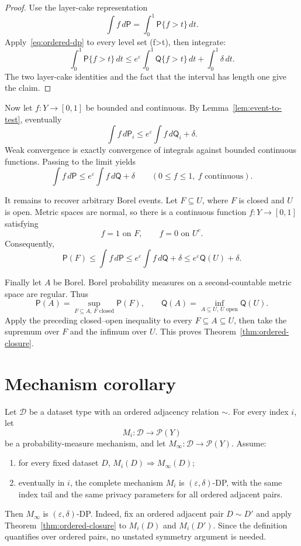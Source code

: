 \documentclass[11pt]{article}
\newcommand{\Pp}{\mathsf P}
\newcommand{\Qq}{\mathsf Q}
\begin{document}
\begin{proof}
Use the layer-cake representation
\[
  \int f\,d\Pp
  =
  \int_0^1 \Pp\{f>t\}\,dt.
\]
Apply~\eqref{eq:ordered-dp} to every level set ({f>t}), then integrate:
\[
  \int_0^1 \Pp\{f>t\}\,dt
  \leq
  e^\varepsilon\int_0^1 \Qq\{f>t\}\,dt
  +\int_0^1\delta\,dt.
\]
The two layer-cake identities and the fact that the interval has length one
give the claim.
\end{proof}

Now let \(f:Y\to[0,1]\) be bounded and continuous.  By
Lemma~\ref{lem:event-to-test}, eventually
\[
  \int f\,d\Pp_i
  \leq
  e^\varepsilon\int f\,d\Qq_i+\delta.
\]
Weak convergence is exactly convergence of integrals against bounded
continuous functions.  Passing to the limit yields
\begin{equation}
  \int f\,d\Pp
  \leq
  e^\varepsilon\int f\,d\Qq+\delta
  \qquad (0\leq f\leq1,\ f\text{ continuous}).
  \label{eq:continuous-test}
\end{equation}

It remains to recover arbitrary Borel events.  Let \(F\subseteq U\), where
\(F\) is closed and \(U\) is open.  Metric spaces are normal, so there is a
continuous function \(f:Y\to[0,1]\) satisfying
\[
  f=1\text{ on }F,
  \qquad
  f=0\text{ on }U^c.
\]
Consequently,
\[
  \Pp(F)
  \leq \int f\,d\Pp
  \leq e^\varepsilon\int f\,d\Qq+\delta
  \leq e^\varepsilon\Qq(U)+\delta.
\]

Finally let \(A\) be Borel.  Borel probability measures on a
second-countable metric space are regular.  Thus
\[
  \Pp(A)=\sup_{F\subseteq A,\,F\text{ closed}}\Pp(F),
  \qquad
  \Qq(A)=\inf_{A\subseteq U,\,U\text{ open}}\Qq(U).
\]
Apply the preceding closed--open inequality to every
\(F\subseteq A\subseteq U\), then take the supremum over \(F\) and the
infimum over \(U\).  This proves Theorem~\ref{thm:ordered-closure}.

\section{Mechanism corollary}

Let \(\mathcal D\) be a dataset type with an ordered adjacency relation
\(\sim\).  For every index \(i\), let
\[
  M_i:\mathcal D\to\mathcal P(Y)
\]
be a probability-measure mechanism, and let
\(M_\infty:\mathcal D\to\mathcal P(Y)\).  Assume:
\begin{enumerate}
  \item for every fixed dataset \(D\), \(M_i(D)\Rightarrow M_\infty(D)\);
  \item eventually in \(i\), the complete mechanism \(M_i\) is
  \((\varepsilon,\delta)\)-DP, with the same index tail and the same privacy
  parameters for all ordered adjacent pairs.
\end{enumerate}
Then \(M_\infty\) is \((\varepsilon,\delta)\)-DP.  Indeed, fix an ordered
adjacent pair \(D\sim D'\) and apply Theorem~\ref{thm:ordered-closure} to
\(M_i(D)\) and \(M_i(D')\).  Since the definition quantifies over ordered
pairs, no unstated symmetry argument is needed.
\end{document}
